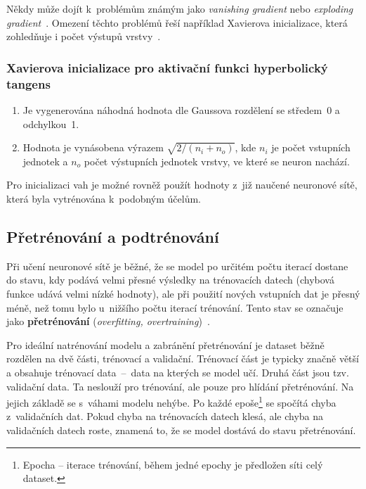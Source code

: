 Někdy může dojít k~problémům známým jako \textit{vanishing gradient} nebo \textit{exploding gradient}~\cite{paperGradientProblems}. Omezení těchto problémů řeší například Xavierova inicializace, která zohledňuje i počet výstupů vrstvy~\cite{hackernoonXavier}.

\subsubsection*{Xavierova inicializace pro aktivační funkci hyperbolický tangens}
\begin{enumerate}
    \item Je vygenerována náhodná hodnota dle Gaussova rozdělení se středem~0 a odchylkou~1.
    \item Hodnota je vynásobena výrazem $\sqrt{2/(n_i+n_o)}$, kde $n_i$ je počet vstupních jednotek a $n_o$ počet výstupních jednotek vrstvy, ve které se neuron nachází.
\end{enumerate}

Pro inicializaci vah je možné rovněž použít hodnoty z~již naučené neuronové sítě, která byla vytrénována k~podobným účelům.


\subsection*{Přetrénování a podtrénování}

Při učení neuronové sítě je běžné, že se model po určitém počtu iterací dostane do stavu, kdy podává velmi přesné výsledky na trénovacích datech (chybová funkce udává velmi nízké hodnoty), ale při použití nových vstupních dat je přesný méně, než tomu bylo u~nižšího počtu iterací trénování. Tento stav se označuje jako \textbf{přetrénování} (\textit{overfitting, overtraining})~\cite{wikiOverfitting}.

Pro ideální natrénování modelu a zabránění přetrénování je dataset běžně rozdělen na dvě části, trénovací a validační. Trénovací část je typicky značně větší a obsahuje trénovací data~--~data na kterých se model učí. Druhá část jsou tzv. validační data. Ta neslouží pro trénování, ale pouze pro hlídání přetrénování. Na jejich základě se s~váhami modelu nehýbe. Po každé epoše\footnote{Epocha -- iterace trénování, během jedné epochy je předložen síti celý dataset.} se spočítá chyba z~validačních dat. Pokud chyba na trénovacích datech klesá, ale chyba na validačních datech roste, znamená to, že se model dostává do stavu přetrénování.

